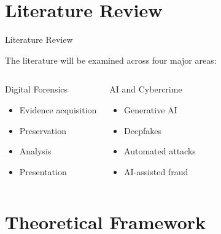 \documentclass[aspectratio=169,11pt]{beamer}
\begin{document}
	
	\section{Literature Review}
	
	\begin{frame}{Literature Review}
		
		The literature will be examined across four major areas:
		
		\begin{columns}
			
			
			\begin{block}{Digital Forensics}
				\begin{itemize}
					\item Evidence acquisition
					\item Preservation
					\item Analysis
					\item Presentation
				\end{itemize}
			\end{block}
			
			
			\begin{block}{AI and Cybercrime}
				\begin{itemize}
					\item Generative AI
					\item Deepfakes
					\item Automated attacks
					\item AI-assisted fraud
				\end{itemize}
			\end{block}
			
		\end{columns}
		
	\end{frame}
	
	
	\section{Theoretical Framework}
	
\end{document}
